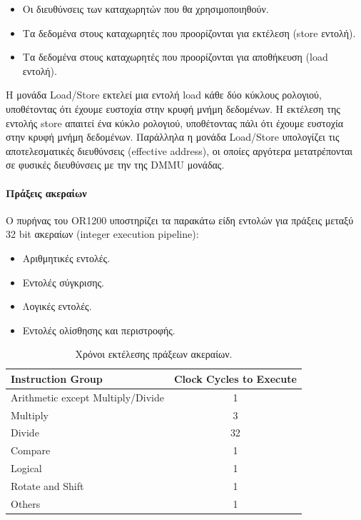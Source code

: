 \documentclass[a4paper,10pt]{article}
\numberwithin{figure}{section}
\numberwithin{table}{section}
\begin{document}
\begin{itemize}
 \item Οι διευθύνσεις των καταχωρητών που θα χρησιμοποιηθούν.
 \item Τα δεδομένα στους καταχωρητές που προορίζονται για εκτέλεση (store εντολή).
 \item Τα δεδομένα στους καταχωρητές που προορίζονται για αποθήκευση (load εντολή).
\end{itemize}


Η μονάδα Load/Store εκτελεί μια εντολή load κάθε δύο κύκλους ρολογιού, υποθέτοντας ότι 
έχουμε ευστοχία στην κρυφή μνήμη δεδομένων. Η εκτέλεση της εντολής store απαιτεί ένα 
κύκλο ρολογιού, υποθέτοντας πάλι ότι έχουμε ευστοχία στην κρυφή μνήμη δεδομένων. Παράλληλα
η μονάδα Load/Store υπολογίζει τις αποτελεσματικές διευθύνσεις (effective address), οι
οποίες αργότερα μετατρέπονται σε φυσικές διευθύνσεις με την της DMMU μονάδας.

\paragraph{Πράξεις ακεραίων\newline\newline}

Ο πυρήνας του OR1200 υποστηρίζει τα παρακάτω είδη εντολών για πράξεις μεταξύ 32 bit ακεραίων (integer execution pipeline):
\begin{itemize}
 \item Αριθμητικές εντολές.
 \item Εντολές σύγκρισης.
 \item Λογικές εντολές.
 \item Εντολές ολίσθησης και περιστροφής.
\end{itemize}

\vspace{0.7cm}
\begin{table}[h!]
\begin{center}
\begin{tabular}{|l|c|}\hline
\rowcolor{tcA}
Instruction Group & Clock Cycles to Execute\\\hline
Arithmetic except Multiply/Divide & 1\\\hline
Multiply & 3\\\hline
Divide & 32\\\hline
Compare & 1\\\hline
Logical & 1\\\hline
Rotate and Shift & 1\\\hline
Others & 1\\\hline
\end{tabular}
\end{center}
\caption{Χρόνοι εκτέλεσης πράξεων ακεραίων.}
\end{table}
\vspace{0.7cm}
\end{document}
